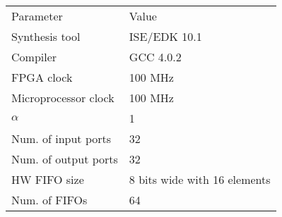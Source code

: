 
\begin{tabular}{ll}
\hline\noalign{\smallskip}
Parameter & Value \\
\noalign{\smallskip}
\hline
\noalign{\smallskip}
Synthesis tool & ISE/EDK 10.1 \\
Compiler & GCC 4.0.2 \\
FPGA clock & 100 MHz \\
Microprocessor clock & 100 MHz \\
$\alpha$ & 1 \\
Num. of input ports & 32 \\
Num. of output ports & 32 \\
HW FIFO size & 8 bits wide with 16 elements \\
Num. of FIFOs & 64 \\
\hline
\end{tabular}